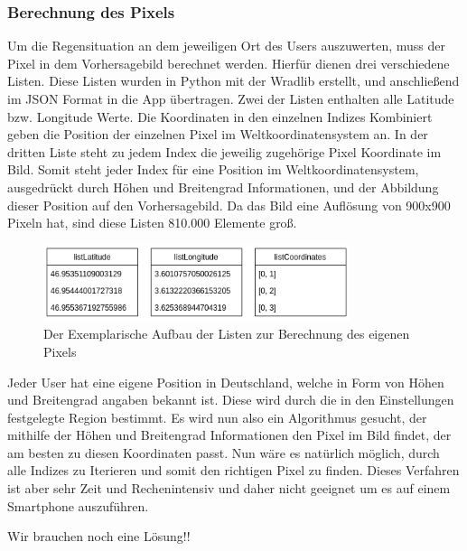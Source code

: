 \subsubsection*{Berechnung des Pixels} \label{sec: pixel_berechnung}
Um die Regensituation an dem jeweiligen Ort des Users auszuwerten, muss der Pixel in dem Vorhersagebild berechnet werden. 
Hierfür dienen drei verschiedene Listen. Diese Listen wurden in Python mit der Wradlib erstellt, und anschließend 
im JSON Format in die App übertragen. 
Zwei der Listen enthalten alle Latitude bzw. Longitude Werte.
Die Koordinaten in den einzelnen Indizes Kombiniert geben die Position der einzelnen Pixel im Weltkoordinatensystem an.
In der dritten Liste steht zu jedem Index die jeweilig zugehörige Pixel Koordinate im Bild. 
Somit steht jeder Index für eine Position im Weltkoordinatensystem, ausgedrückt durch Höhen und Breitengrad Informationen, 
und der Abbildung dieser Position auf den Vorhersagebild.
Da das Bild eine Auflösung von 900x900 Pixeln hat, sind diese Listen 810.000 Elemente groß. 
\begin{figure}[H]
  \centering
  \includegraphics[width=0.8\textwidth,angle=0]{abb/listen_pixel_berechnung.png}
  \caption{Der Exemplarische Aufbau der Listen zur Berechnung des eigenen Pixels}
 \label{fig:sequence_diagram_app_start}
 \end{figure}
 Jeder User hat eine eigene Position in Deutschland, welche in Form von Höhen und Breitengrad angaben bekannt ist. 
 Diese wird durch die in den Einstellungen festgelegte Region bestimmt. 
 Es wird nun also ein Algorithmus gesucht, der mithilfe der Höhen und Breitengrad Informationen den Pixel im Bild findet, 
 der am besten zu diesen Koordinaten passt. 
 Nun wäre es natürlich möglich, durch alle Indizes zu Iterieren und somit den richtigen Pixel zu finden. Dieses Verfahren 
 ist aber sehr Zeit und Rechenintensiv und daher nicht geeignet um  es auf einem Smartphone auszuführen. 

 Wir brauchen noch eine Lösung!! 

